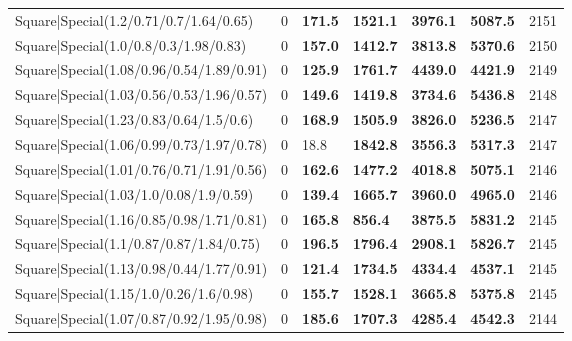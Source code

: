 \begin{tabular}{lrllllr}
 Square|Special(1.2/0.71/0.7/1.64/0.65)                        &             0   & \textbf{171.5} & \textbf{1521.1} & \textbf{3976.1} & \textbf{5087.5} &         2151 \\
 Square|Special(1.0/0.8/0.3/1.98/0.83)                         &             0   & \textbf{157.0} & \textbf{1412.7} & \textbf{3813.8} & \textbf{5370.6} &         2150 \\
 Square|Special(1.08/0.96/0.54/1.89/0.91)                      &             0   & \textbf{125.9} & \textbf{1761.7} & \textbf{4439.0} & \textbf{4421.9} &         2149 \\
 Square|Special(1.03/0.56/0.53/1.96/0.57)                      &             0   & \textbf{149.6} & \textbf{1419.8} & \textbf{3734.6} & \textbf{5436.8} &         2148 \\
 Square|Special(1.23/0.83/0.64/1.5/0.6)                        &             0   & \textbf{168.9} & \textbf{1505.9} & \textbf{3826.0} & \textbf{5236.5} &         2147 \\
 Square|Special(1.06/0.99/0.73/1.97/0.78)                      &             0   & 18.8           & \textbf{1842.8} & \textbf{3556.3} & \textbf{5317.3} &         2147 \\
 Square|Special(1.01/0.76/0.71/1.91/0.56)                      &             0   & \textbf{162.6} & \textbf{1477.2} & \textbf{4018.8} & \textbf{5075.1} &         2146 \\
 Square|Special(1.03/1.0/0.08/1.9/0.59)                        &             0   & \textbf{139.4} & \textbf{1665.7} & \textbf{3960.0} & \textbf{4965.0} &         2146 \\
 Square|Special(1.16/0.85/0.98/1.71/0.81)                      &             0   & \textbf{165.8} & \textbf{856.4}  & \textbf{3875.5} & \textbf{5831.2} &         2145 \\
 Square|Special(1.1/0.87/0.87/1.84/0.75)                       &             0   & \textbf{196.5} & \textbf{1796.4} & \textbf{2908.1} & \textbf{5826.7} &         2145 \\
 Square|Special(1.13/0.98/0.44/1.77/0.91)                      &             0   & \textbf{121.4} & \textbf{1734.5} & \textbf{4334.4} & \textbf{4537.1} &         2145 \\
 Square|Special(1.15/1.0/0.26/1.6/0.98)                        &             0   & \textbf{155.7} & \textbf{1528.1} & \textbf{3665.8} & \textbf{5375.8} &         2145 \\
 Square|Special(1.07/0.87/0.92/1.95/0.98)                      &             0   & \textbf{185.6} & \textbf{1707.3} & \textbf{4285.4} & \textbf{4542.3} &         2144 \\

\end{tabular}
